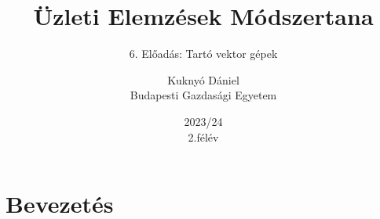 \documentclass[english, aspectratio=169]{beamer}
\makeatletter
\newcommand\makebeamertitle{\frame{\maketitle}}
\let\origtableofcontents=\tableofcontents
\def\tableofcontents{\@ifnextchar[{\origtableofcontents}{\gobbletableofcontents}}
\def\gobbletableofcontents#1{\origtableofcontents}
\makeatother
\begin{document}
\section{Bevezetés}
\title[]{Üzleti Elemzések Módszertana}
\subtitle{6. Előadás: Tartó vektor gépek}
\author[Kuknyó Dániel]{Kuknyó Dániel\\Budapesti Gazdasági Egyetem}
\date{2023/24\\2.félév}
\makebeamertitle

\begin{frame}
\tableofcontents{}
\end{frame}

\begin{frame}
\tableofcontents[currentsection]
\end{frame}
\end{document}
